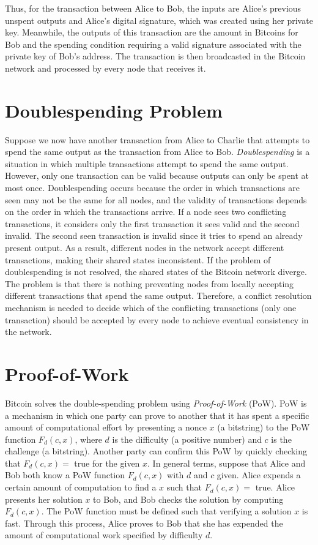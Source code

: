 \documentclass{article}
\begin{document}
Thus, for the transaction between Alice to Bob, the inputs are Alice's previous
unspent outputs and Alice's digital signature, which was created using her
private key. Meanwhile, the outputs of this transaction are the amount in
Bitcoins for Bob and the spending condition requiring a valid signature
associated with the private key of Bob's address. The transaction is then
broadcasted in the Bitcoin network and processed by every node that receives it.

\section{Doublespending Problem}

Suppose we now have another transaction from Alice to Charlie that attempts to
spend the same output as the transaction from Alice to Bob.
\emph{Doublespending} is a situation in which multiple transactions attempt to
spend the same output. However, only one transaction can be valid because
outputs can only be spent at most once. Doublespending occurs because the order
in which transactions are seen may not be the same for all nodes, and the
validity of transactions depends on the order in which the transactions arrive.
If a node sees two conflicting transactions, it considers only the first
transaction it sees valid and the second invalid. The second seen transaction is
invalid since it tries to spend an already present output. As a result,
different nodes in the network accept different transactions, making their
shared states inconsistent. If the problem of doublespending is not resolved,
the shared states of the Bitcoin network diverge. The problem is that there is
nothing preventing nodes from locally accepting different transactions that
spend the same output. Therefore, a conflict resolution mechanism is needed to
decide which of the conflicting transactions (only one transaction) should be
accepted by every node to achieve eventual consistency in the network.

\section{Proof-of-Work}

Bitcoin solves the double-spending problem using \emph{Proof-of-Work} (PoW). PoW
is a mechanism in which one party can prove to another that it has spent a
specific amount of computational effort by presenting a nonce $x$ (a bitstring)
to the PoW function $F_d(c,x)$, where $d$ is the difficulty (a positive number)
and $c$ is the challenge (a bitstring). Another party can confirm this PoW by
quickly checking that $F_d(c,x) =$ true for the given $x$. In general terms,
suppose that Alice and Bob both know a PoW function $F_d(c,x)$ with $d$ and $c$
given. Alice expends a certain amount of computation to find a $x$ such that
$F_d(c,x) =$ true. Alice presents her solution $x$ to Bob, and Bob checks the
solution by computing $F_d(c,x)$. The PoW function must be defined such that
verifying a solution $x$ is fast. Through this process, Alice proves to Bob that
she has expended the amount of computational work specified by difficulty $d$.
\end{document}
